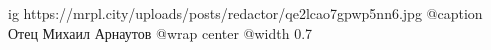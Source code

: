  
 
 
 
 

\ifcmt
  ig https://mrpl.city/uploads/posts/redactor/qe2lcao7gpwp5nn6.jpg
	@caption Отец Михаил Арнаутов
  @wrap center
  @width 0.7
\fi

